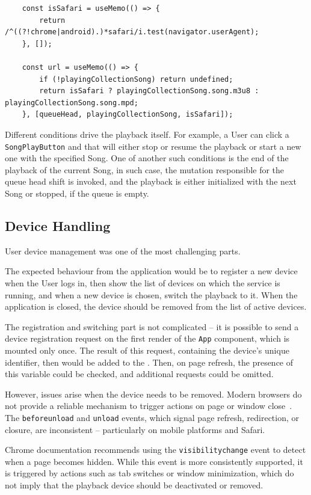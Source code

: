 \begin{verbatim}
    const isSafari = useMemo(() => {
        return /^((?!chrome|android).)*safari/i.test(navigator.userAgent);
    }, []);

    const url = useMemo(() => {
        if (!playingCollectionSong) return undefined;
        return isSafari ? playingCollectionSong.song.m3u8 : playingCollectionSong.song.mpd;
    }, [queueHead, playingCollectionSong, isSafari]);
\end{verbatim}

Different conditions drive the playback itself. For example, a User can click
a \texttt{SongPlayButton} and that will either stop or resume the playback or start
a new one with the specified Song. One of another such conditions is the end of the
playback of the current Song, in such case, the mutation responsible for the queue head
shift is invoked, and the playback is either initialized with the next Song or stopped, if the
queue is empty.

\subsection{Device Handling}\label{subsec:fedevices}
User device management was one of the most challenging parts.

The expected behaviour from the application would be to register a new device when
the User logs in, then show the list of devices on
which the service is running, and when a new device is chosen, switch the playback to it.
When the application is closed, the device should be removed from the list of active devices.

The registration and switching part is not complicated -- it is possible to send
a device registration request on the first render of the \texttt{App} component,
which is mounted only once. The result of this request,
containing the device's unique identifier, then would be added to the .
Then, on page refresh, the presence of this variable could be checked, and additional requests
could be omitted.


However, issues arise when the device needs to be removed.
Modern browsers do not provide a reliable mechanism to trigger actions on
page or window close~\cite{chromelfapi,beacons}.
The \texttt{beforeunload} and \texttt{unload} events,
which signal page refresh, redirection, or closure,
are inconsistent -- particularly on mobile platforms and Safari.


Chrome documentation recommends using the \texttt{visibilitychange} event to detect when
a page becomes hidden. While this event is more
consistently supported, it is triggered by actions such as
tab switches or window minimization, which do not imply that the
playback device should be deactivated or removed.


